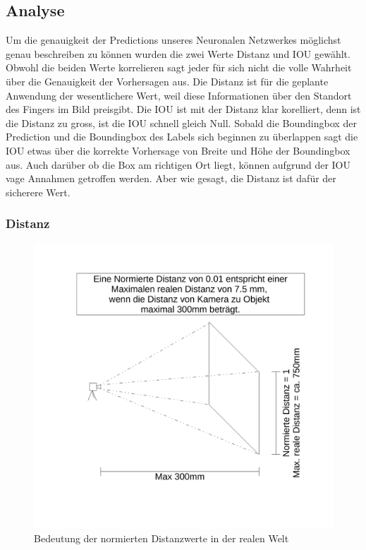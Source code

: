 \documentclass[a4paper,12pt]{article}
\begin{document}
\subsection{Analyse}
Um die genauigkeit der Predictions unseres Neuronalen Netzwerkes möglichst genau beschreiben zu können wurden die zwei Werte Distanz und IOU gewählt. 
Obwohl die beiden Werte korrelieren sagt jeder für sich nicht die volle Wahrheit über die Genauigkeit der Vorhersagen aus. 
Die Distanz ist für die geplante Anwendung der wesentlichere Wert, weil diese Informationen über den Standort des Fingers im Bild preisgibt.
Die IOU ist mit der Distanz klar korelliert, denn ist die Distanz zu gross, ist die IOU schnell gleich Null. 
Sobald die Boundingbox der Prediction und die Boundingbox des Labels sich beginnen zu überlappen sagt die IOU etwas über die korrekte Vorhersage von Breite und Höhe der Boundingbox aus. Auch darüber ob die Box am richtigen Ort liegt, können aufgrund der IOU vage Annahmen getroffen werden. Aber wie gesagt, die Distanz ist dafür der sicherere Wert. 

\subsubsection{Distanz}

\begin{figure}	
	\centering
	\includegraphics[width=.7\textwidth]{BilderResultate/DistanzenBerechnung.pdf}
	\caption{Bedeutung der normierten Distanzwerte in der realen Welt}
	\label{img:explain_normed_distance}
\end{figure}
\end{document}
